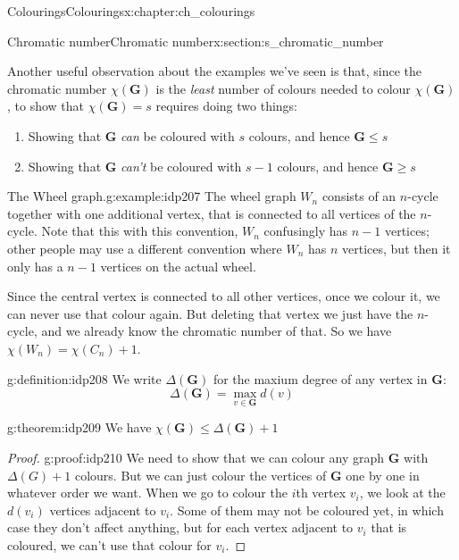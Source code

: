 \documentclass[oneside,10pt,]{book}
\numberwithin{equation}{section}
\newcommand{\bfG}{\mathbf{G}}
\begin{document}
\begin{chapterptx}{Colourings}{}{Colourings}{}{}{x:chapter:ch_colourings}
\begin{sectionptx}{Chromatic number}{}{Chromatic number}{}{}{x:section:s_chromatic_number}
\par
Another useful observation about the examples we've seen is that, since the chromatic number \(\chi(\bfG)\) is the \emph{least} number of colours needed to colour \(\chi(\bfG)\), to show that \(\chi(\bfG)=s\) requires doing two things:%
\begin{enumerate}
\item{}Showing that \(\bfG\) \emph{can} be coloured with \(s\) colours, and hence \(\bfG\leq s\)%
\item{}Showing that \(\bfG\) \emph{can't} be coloured with \(s-1\) colours, and hence \(\bfG\geq s\)%
\end{enumerate}
%
\begin{example}{The Wheel graph.}{g:example:idp207}%
The wheel graph \(W_n\) consists of an \(n\)-cycle together with one additional vertex, that is connected to all vertices of the \(n\)-cycle.  Note that this with this convention, \(W_n\) confusingly has \(n-1\) vertices; other people may use a different convention where \(W_n\) has \(n\) vertices, but then it only has a \(n-1\) vertices on the actual wheel.%
\par
Since the central vertex is connected to all other vertices, once we colour it, we can never use that colour again.  But deleting that vertex we just have the \(n\)-cycle, and we already know the chromatic number of that.  So we have \(\chi(W_n)=\chi(C_n)+1\).%
\end{example}
\begin{definition}{}{g:definition:idp208}%
We write \(\Delta(\bfG)\) for the maxium degree of any vertex in \(\bfG\):%
\begin{equation*}
\Delta(\bfG)=\max_{v\in \bfG} d(v)
\end{equation*}
%
\end{definition}
\begin{theorem}{}{}{g:theorem:idp209}%
We have \(\chi(\bfG)\leq \Delta(\bfG)+1\)%
\end{theorem}
\begin{proof}{}{g:proof:idp210}
We need to show that we can colour any graph \(\bfG\) with \(\Delta(G)+1\) colours.  But we can just colour the vertices of \(\bfG\) one by one in whatever order we want.  When we go to colour the \(i\)th vertex \(v_i\), we look at the \(d(v_i)\) vertices adjacent to \(v_i\).  Some of them may not be coloured yet, in which case they don't affect anything, but for each vertex adjacent to \(v_i\) that is coloured, we can't use that colour for \(v_i\).%
\par

\end{proof}
\end{sectionptx}
\end{chapterptx}
\end{document}
